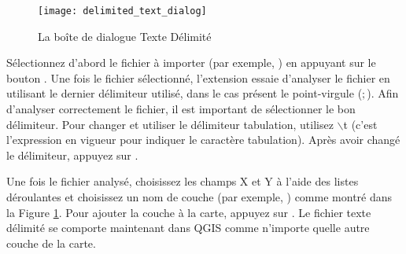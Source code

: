 \begin{figure}[ht]
   \begin{center}
   \caption{La boîte de dialogue Texte Délimité \nixcaption}\label{fig:delim_text_plugin_dialog}\smallskip
   \texttt{[image: delimited\_text\_dialog]}
   \end{center}  
\end{figure}

Sélectionnez d'abord le fichier à importer (par exemple, ) 
en appuyant sur le bouton . Une fois le fichier 
sélectionné, l'extension essaie d'analyser le fichier en utilisant le dernier 
délimiteur utilisé, dans le cas présent le point-virgule (\mbox{$;$}). 
Afin d'analyser correctement le fichier, il est important de sélectionner le 
bon délimiteur. Pour changer et utiliser le délimiteur tabulation, utilisez \mbox{$\backslash$}t 
(c'est l'expression en vigueur pour indiquer le caractère tabulation).
Après avoir changé le délimiteur, appuyez sur .

Une fois le fichier analysé, choisissez les champs X et Y à l'aide des listes 
déroulantes et choisissez un nom de couche (par exemple,  ) 
comme montré dans la Figure \ref{fig:delim_text_plugin_dialog}. Pour ajouter 
la couche à la carte, appuyez sur . Le fichier texte délimité se 
comporte maintenant dans QGIS comme n'importe quelle autre couche de la carte.
